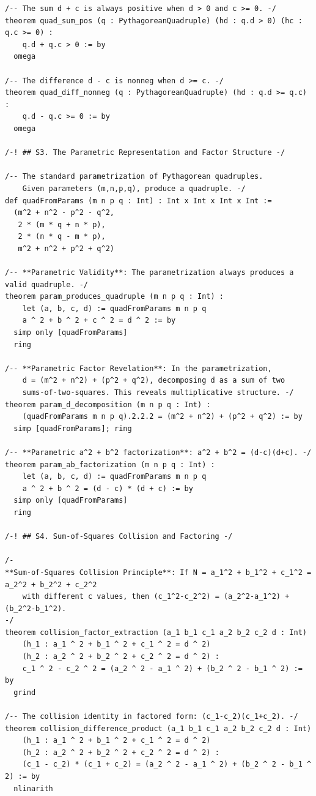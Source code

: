\documentclass[11pt,openright,twoside]{book}
\theoremstyle{definition}
\begin{document}
\begin{lstlisting}[style=lean]
/-- The sum d + c is always positive when d > 0 and c >= 0. -/
theorem quad_sum_pos (q : PythagoreanQuadruple) (hd : q.d > 0) (hc : q.c >= 0) :
    q.d + q.c > 0 := by
  omega

/-- The difference d - c is nonneg when d >= c. -/
theorem quad_diff_nonneg (q : PythagoreanQuadruple) (hd : q.d >= q.c) :
    q.d - q.c >= 0 := by
  omega

/-! ## S3. The Parametric Representation and Factor Structure -/

/-- The standard parametrization of Pythagorean quadruples.
    Given parameters (m,n,p,q), produce a quadruple. -/
def quadFromParams (m n p q : Int) : Int x Int x Int x Int :=
  (m^2 + n^2 - p^2 - q^2,
   2 * (m * q + n * p),
   2 * (n * q - m * p),
   m^2 + n^2 + p^2 + q^2)

/-- **Parametric Validity**: The parametrization always produces a valid quadruple. -/
theorem param_produces_quadruple (m n p q : Int) :
    let (a, b, c, d) := quadFromParams m n p q
    a ^ 2 + b ^ 2 + c ^ 2 = d ^ 2 := by
  simp only [quadFromParams]
  ring

/-- **Parametric Factor Revelation**: In the parametrization,
    d = (m^2 + n^2) + (p^2 + q^2), decomposing d as a sum of two
    sums-of-two-squares. This reveals multiplicative structure. -/
theorem param_d_decomposition (m n p q : Int) :
    (quadFromParams m n p q).2.2.2 = (m^2 + n^2) + (p^2 + q^2) := by
  simp [quadFromParams]; ring

/-- **Parametric a^2 + b^2 factorization**: a^2 + b^2 = (d-c)(d+c). -/
theorem param_ab_factorization (m n p q : Int) :
    let (a, b, c, d) := quadFromParams m n p q
    a ^ 2 + b ^ 2 = (d - c) * (d + c) := by
  simp only [quadFromParams]
  ring

/-! ## S4. Sum-of-Squares Collision and Factoring -/

/-
**Sum-of-Squares Collision Principle**: If N = a_1^2 + b_1^2 + c_1^2 = a_2^2 + b_2^2 + c_2^2
    with different c values, then (c_1^2-c_2^2) = (a_2^2-a_1^2) + (b_2^2-b_1^2).
-/
theorem collision_factor_extraction (a_1 b_1 c_1 a_2 b_2 c_2 d : Int)
    (h_1 : a_1 ^ 2 + b_1 ^ 2 + c_1 ^ 2 = d ^ 2)
    (h_2 : a_2 ^ 2 + b_2 ^ 2 + c_2 ^ 2 = d ^ 2) :
    c_1 ^ 2 - c_2 ^ 2 = (a_2 ^ 2 - a_1 ^ 2) + (b_2 ^ 2 - b_1 ^ 2) := by
  grind

/-- The collision identity in factored form: (c_1-c_2)(c_1+c_2). -/
theorem collision_difference_product (a_1 b_1 c_1 a_2 b_2 c_2 d : Int)
    (h_1 : a_1 ^ 2 + b_1 ^ 2 + c_1 ^ 2 = d ^ 2)
    (h_2 : a_2 ^ 2 + b_2 ^ 2 + c_2 ^ 2 = d ^ 2) :
    (c_1 - c_2) * (c_1 + c_2) = (a_2 ^ 2 - a_1 ^ 2) + (b_2 ^ 2 - b_1 ^ 2) := by
  nlinarith


\end{lstlisting}
\end{document}
